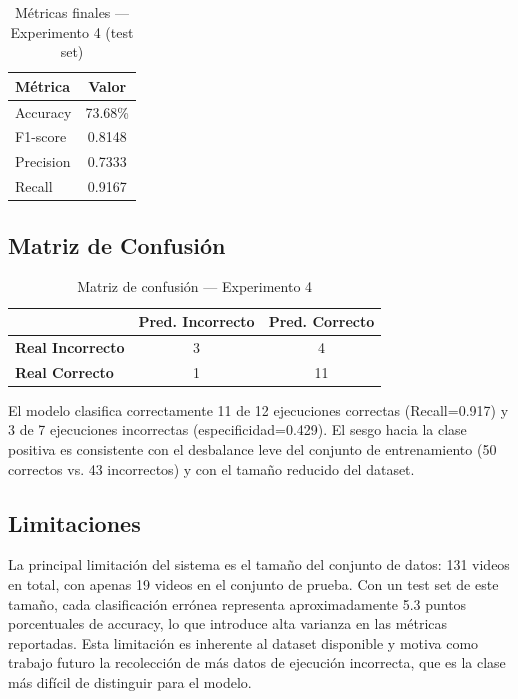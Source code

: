 \documentclass[conference]{IEEEtran}
\begin{document}
\begin{table}[h]
  \centering
  \caption{Métricas finales — Experimento 4 (test set)}
  \begin{tabular}{lc}
    \hline
    \textbf{Métrica}  & \textbf{Valor} \\
    \hline
    Accuracy          & 73.68\%        \\
    F1-score          & 0.8148         \\
    Precision         & 0.7333         \\
    Recall            & 0.9167         \\
    \hline
  \end{tabular}
  \label{tab:results}
\end{table}

\subsection{Matriz de Confusión}

\begin{table}[h]
  \centering
  \caption{Matriz de confusión — Experimento 4}
  \begin{tabular}{lcc}
    \hline
    & \textbf{Pred. Incorrecto} & \textbf{Pred. Correcto} \\
    \hline
    \textbf{Real Incorrecto} & 3 & 4 \\
    \textbf{Real Correcto}   & 1 & 11 \\
    \hline
  \end{tabular}
  \label{tab:confusion}
\end{table}

El modelo clasifica correctamente 11 de 12 ejecuciones
correctas (Recall=0.917) y 3 de 7 ejecuciones incorrectas
(especificidad=0.429). El sesgo hacia la clase positiva
es consistente con el desbalance leve del conjunto de
entrenamiento (50 correctos vs. 43 incorrectos) y con
el tamaño reducido del dataset.

\subsection{Limitaciones}

La principal limitación del sistema es el tamaño del
conjunto de datos: 131 videos en total, con apenas 19
videos en el conjunto de prueba. Con un test set de este
tamaño, cada clasificación errónea representa
aproximadamente 5.3 puntos porcentuales de accuracy,
lo que introduce alta varianza en las métricas reportadas.
Esta limitación es inherente al dataset disponible y
motiva como trabajo futuro la recolección de más datos de
ejecución incorrecta, que es la clase más difícil de
distinguir para el modelo.
\end{document}
